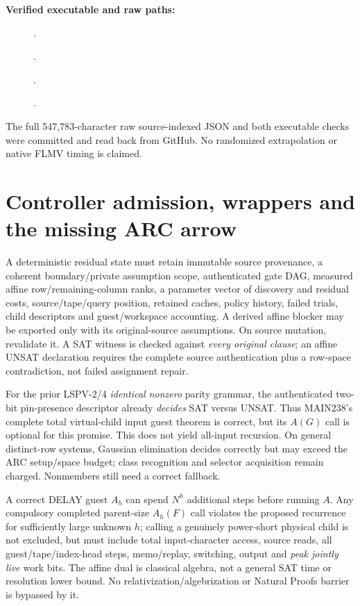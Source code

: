 \documentclass[11pt]{article}
\begin{document}
\noindent\textbf{Verified executable and raw paths:}
\begin{description}
\item[] .
\item[] .
\item[] .
\item[] .
\end{description}
The full 547,783-character raw source-indexed JSON and both executable checks were committed and read back from GitHub. No randomized extrapolation or native FLMV timing is claimed.

\section{Controller admission, wrappers and the missing ARC arrow}
A deterministic residual state must retain immutable source provenance, a coherent boundary/private assumption scope, authenticated gate DAG, measured affine row/remaining-column ranks, a parameter vector of discovery and residual costs, source/tape/query position, retained caches, policy history, failed trials, child descriptors and guest/workspace accounting. A derived affine blocker may be exported only with its original-source assumptions. On source mutation, revalidate it. A SAT witness is checked against \emph{every original clause}; an affine UNSAT declaration requires the complete source authentication plus a row-space contradiction, not failed assignment repair.

For the prior LSPV-2/4 \emph{identical nonzero} parity grammar, the authenticated two-bit pin-presence descriptor already \emph{decides} SAT versus UNSAT. Thus MAIN238's complete total virtual-child input guest theorem is correct, but its $A(G)$ call is optional for this promise. This does not yield all-input recursion. On general distinct-row systems, Gaussian elimination decides correctly but may exceed the ARC setup/space budget; class recognition and selector acquisition remain charged. Nonmembers still need a correct fallback.

A correct DELAY guest $A_h$ can spend $N^h$ additional steps before running $A$. Any compulsory completed parent-size $A_h(F)$ call violates the proposed recurrence for sufficiently large unknown $h$; calling a genuinely power-short physical child is not excluded, but must include total input-character access, source reads, all guest/tape/index-head steps, memo/replay, switching, output and \emph{peak jointly live} work bits. The affine dual is classical algebra, not a general SAT time or resolution lower bound. No relativization/algebrization or Natural Proofs barrier is bypassed by it.
\end{document}
